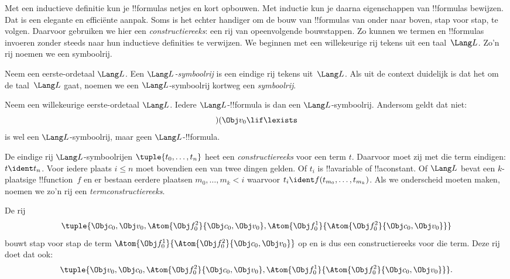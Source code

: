 \documentclass[../../../include/open-logic-section]{subfiles}
\begin{document}


Met een inductieve definitie kun je !!{formula}s netjes en kort
opbouwen. Met inductie kun je daarna eigenschappen van !!{formula}s
bewijzen. Dat is een elegante en efficiënte aanpak. Soms is het echter
handiger om de bouw van !!{formula}s van onder naar boven, stap voor
stap, te volgen. Daarvoor gebruiken we hier een
\emph{constructiereeks}: een rij van opeenvolgende bouwstappen.
%
Zo kunnen we termen en !!{formula}s invoeren zonder steeds naar hun
inductieve definities te verwijzen. We beginnen met een willekeurige rij
tekens uit een taal~$\Lang L$. Zo'n rij noemen we een symboolrij.

\begin{defn}
Neem een eerste-ordetaal $\Lang L$. Een \emph{$\Lang L$-symboolrij} is
een eindige rij tekens uit~$\Lang L$. Als uit de context duidelijk is
dat het om de taal~$\Lang L$ gaat, noemen we een
$\Lang L$-symboolrij kortweg een \emph{symboolrij}.
\end{defn}

\begin{ex}
Neem een willekeurige eerste-ordetaal $\Lang L$. Iedere
$\Lang L$-!!{formula} is dan een $\Lang L$-symboolrij. Andersom geldt
dat niet: \[)(\Obj v_0\lif\lexists\] is wel een
$\Lang L$-symboolrij, maar geen $\Lang L$-!!{formula}.
\end{ex}

\begin{defn}
De eindige rij $\Lang L$-symboolrijen $\tuple{t_0,\dotsc,t_n}$ heet een
\emph{constructiereeks} voor een term $t$. Daarvoor moet zij met die
term eindigen: $t \ident t_n$. Voor iedere plaats $i \leq n$ moet bovendien een van
twee dingen gelden. Of $t_i$ is !!a{variable} of !!a{constant}. Of
$\Lang L$ bevat een $k$-plaatsige !!{function}~$f$ en er
bestaan eerdere plaatsen $m_0,\dotsc,m_k < i$ waarvoor
$t_i \ident f(t_{m_0},\dotsc,t_{m_k})$. Als we onderscheid moeten
maken, noemen we zo'n rij een \emph{termconstructiereeks}.
\end{defn}

\begin{ex}
De rij
\[
    \tuple{\Obj c_0, \Obj v_0, \Atom{\Obj f^2_0}{\Obj c_0, \Obj v_0}, \Atom{\Obj f^1_0}{\Atom{\Obj f^2_0}{\Obj c_0, \Obj v_0}}}
\]
bouwt stap voor stap de term $\Atom{\Obj f^1_0}{\Atom{\Obj
f^2_0}{\Obj c_0, \Obj v_0}}$ op en is dus een constructiereeks voor
die term. Deze rij doet dat ook:
\[
    \tuple{\Obj v_0, \Obj c_0, \Atom{\Obj f^2_0}{\Obj c_0, \Obj v_0}, \Atom{\Obj f^1_0}{\Atom{\Obj f^2_0}{\Obj c_0, \Obj v_0}}}.
\]
\end{ex}
\end{document}
